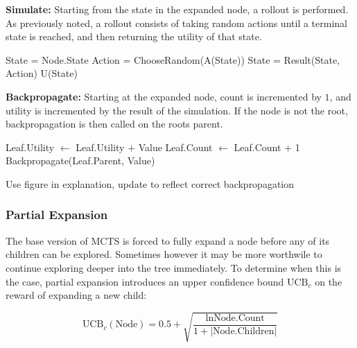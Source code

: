 \textbf{Simulate:} Starting from the state in the expanded node, a rollout
is performed. As previously noted, a rollout consists of taking random
actions until a terminal state is reached, and then returning the utility
of that state.

\begin{algorithm}
    \begin{algorithmic}[1]
            \State State = Node.State
                \State Action = ChooseRandom(A(State))
                \State State = Result(State, Action)
            \EndWhile
            \State \Return U(State)
        \EndProcedure
    \end{algorithmic}    
\end{algorithm}

\textbf{Backpropagate:} Starting at the expanded node, count is 
incremented by $1$, and utility is incremented by the result of
the simulation. If the node is not the root, backpropagation
is then called on the roots parent.

\begin{algorithm}
    \begin{algorithmic}[1]
            \State Leaf.Utility $\leftarrow$ Leaf.Utility $+$ Value
            \State Leaf.Count $\leftarrow$ Leaf.Count $+$ 1
                \State Backpropagate(Leaf.Parent, Value)
            \EndIf
        \EndProcedure
    \end{algorithmic}    
\end{algorithm}


\todo Use figure in explanation, update to reflect correct 
backpropagation

\subsubsection{Partial Expansion}
\needcit
The base version of MCTS is forced to fully expand a node
before any of its children can be explored. Sometimes however
it may be more worthwile to continue exploring deeper into the
tree immediately. To determine when this is the case, partial
expansion introduces an upper confidence bound $\text{UCB}_c$ on 
the reward of expanding a new child:

\begin{equation}
    \label{eq:upper_confidence_child}
    \text{UCB}_c(\text{Node}) = 0.5 + \sqrt{\frac{\ln\text{Node.Count}}{1 + |\text{Node.Children}|}}
\end{equation}            

